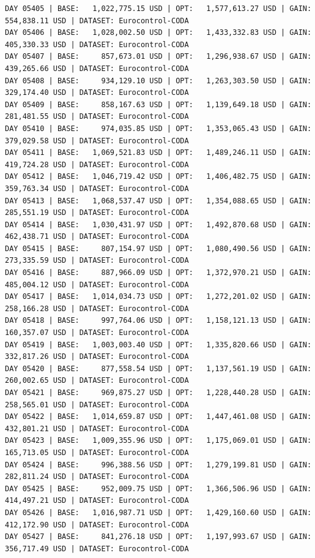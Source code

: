 \documentclass[11pt,a4paper]{article}
\begin{document}
\begin{verbatim}
DAY 05405 | BASE:   1,022,775.15 USD | OPT:   1,577,613.27 USD | GAIN: 554,838.11 USD | DATASET: Eurocontrol-CODA
DAY 05406 | BASE:   1,028,002.50 USD | OPT:   1,433,332.83 USD | GAIN: 405,330.33 USD | DATASET: Eurocontrol-CODA
DAY 05407 | BASE:     857,673.01 USD | OPT:   1,296,938.67 USD | GAIN: 439,265.66 USD | DATASET: Eurocontrol-CODA
DAY 05408 | BASE:     934,129.10 USD | OPT:   1,263,303.50 USD | GAIN: 329,174.40 USD | DATASET: Eurocontrol-CODA
DAY 05409 | BASE:     858,167.63 USD | OPT:   1,139,649.18 USD | GAIN: 281,481.55 USD | DATASET: Eurocontrol-CODA
DAY 05410 | BASE:     974,035.85 USD | OPT:   1,353,065.43 USD | GAIN: 379,029.58 USD | DATASET: Eurocontrol-CODA
DAY 05411 | BASE:   1,069,521.83 USD | OPT:   1,489,246.11 USD | GAIN: 419,724.28 USD | DATASET: Eurocontrol-CODA
DAY 05412 | BASE:   1,046,719.42 USD | OPT:   1,406,482.75 USD | GAIN: 359,763.34 USD | DATASET: Eurocontrol-CODA
DAY 05413 | BASE:   1,068,537.47 USD | OPT:   1,354,088.65 USD | GAIN: 285,551.19 USD | DATASET: Eurocontrol-CODA
DAY 05414 | BASE:   1,030,431.97 USD | OPT:   1,492,870.68 USD | GAIN: 462,438.71 USD | DATASET: Eurocontrol-CODA
DAY 05415 | BASE:     807,154.97 USD | OPT:   1,080,490.56 USD | GAIN: 273,335.59 USD | DATASET: Eurocontrol-CODA
DAY 05416 | BASE:     887,966.09 USD | OPT:   1,372,970.21 USD | GAIN: 485,004.12 USD | DATASET: Eurocontrol-CODA
DAY 05417 | BASE:   1,014,034.73 USD | OPT:   1,272,201.02 USD | GAIN: 258,166.28 USD | DATASET: Eurocontrol-CODA
DAY 05418 | BASE:     997,764.06 USD | OPT:   1,158,121.13 USD | GAIN: 160,357.07 USD | DATASET: Eurocontrol-CODA
DAY 05419 | BASE:   1,003,003.40 USD | OPT:   1,335,820.66 USD | GAIN: 332,817.26 USD | DATASET: Eurocontrol-CODA
DAY 05420 | BASE:     877,558.54 USD | OPT:   1,137,561.19 USD | GAIN: 260,002.65 USD | DATASET: Eurocontrol-CODA
DAY 05421 | BASE:     969,875.27 USD | OPT:   1,228,440.28 USD | GAIN: 258,565.01 USD | DATASET: Eurocontrol-CODA
DAY 05422 | BASE:   1,014,659.87 USD | OPT:   1,447,461.08 USD | GAIN: 432,801.21 USD | DATASET: Eurocontrol-CODA
DAY 05423 | BASE:   1,009,355.96 USD | OPT:   1,175,069.01 USD | GAIN: 165,713.05 USD | DATASET: Eurocontrol-CODA
DAY 05424 | BASE:     996,388.56 USD | OPT:   1,279,199.81 USD | GAIN: 282,811.24 USD | DATASET: Eurocontrol-CODA
DAY 05425 | BASE:     952,009.75 USD | OPT:   1,366,506.96 USD | GAIN: 414,497.21 USD | DATASET: Eurocontrol-CODA
DAY 05426 | BASE:   1,016,987.71 USD | OPT:   1,429,160.60 USD | GAIN: 412,172.90 USD | DATASET: Eurocontrol-CODA
DAY 05427 | BASE:     841,276.18 USD | OPT:   1,197,993.67 USD | GAIN: 356,717.49 USD | DATASET: Eurocontrol-CODA

\end{verbatim}
\end{document}
